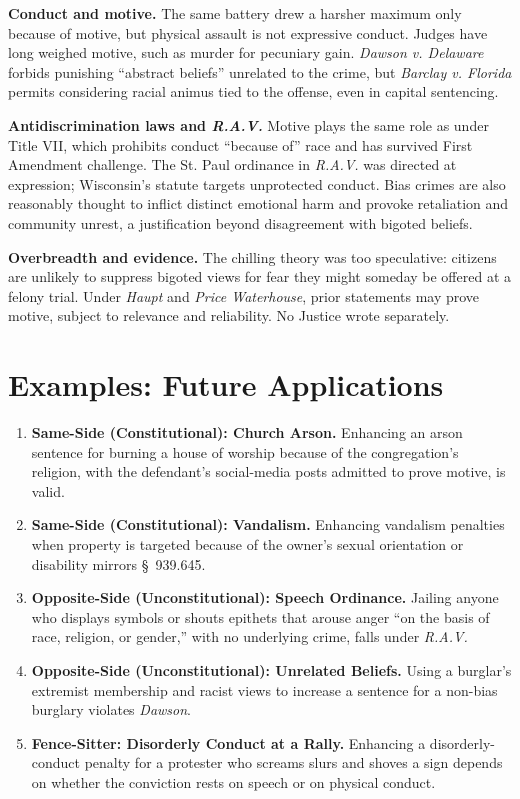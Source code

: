 \documentclass[12pt]{article}
\begin{document}
\textbf{Conduct and motive.} The same battery drew a harsher maximum only because of motive, but physical assault is not expressive conduct. Judges have long weighed motive, such as murder for pecuniary gain. \textit{Dawson v. Delaware} forbids punishing ``abstract beliefs'' unrelated to the crime, but \textit{Barclay v. Florida} permits considering racial animus tied to the offense, even in capital sentencing.

\textbf{Antidiscrimination laws and \textit{R.A.V.}} Motive plays the same role as under Title VII, which prohibits conduct ``because of'' race and has survived First Amendment challenge. The St. Paul ordinance in \textit{R.A.V.} was directed at expression; Wisconsin's statute targets unprotected conduct. Bias crimes are also reasonably thought to inflict distinct emotional harm and provoke retaliation and community unrest, a justification beyond disagreement with bigoted beliefs.

\textbf{Overbreadth and evidence.} The chilling theory was too speculative: citizens are unlikely to suppress bigoted views for fear they might someday be offered at a felony trial. Under \textit{Haupt} and \textit{Price Waterhouse}, prior statements may prove motive, subject to relevance and reliability. No Justice wrote separately.

\section{Examples: Future Applications}

\begin{enumerate}
\item \textbf{Same-Side (Constitutional): Church Arson.} Enhancing an arson sentence for burning a house of worship because of the congregation's religion, with the defendant's social-media posts admitted to prove motive, is valid.
\item \textbf{Same-Side (Constitutional): Vandalism.} Enhancing vandalism penalties when property is targeted because of the owner's sexual orientation or disability mirrors \S~939.645.
\item \textbf{Opposite-Side (Unconstitutional): Speech Ordinance.} Jailing anyone who displays symbols or shouts epithets that arouse anger ``on the basis of race, religion, or gender,'' with no underlying crime, falls under \textit{R.A.V.}
\item \textbf{Opposite-Side (Unconstitutional): Unrelated Beliefs.} Using a burglar's extremist membership and racist views to increase a sentence for a non-bias burglary violates \textit{Dawson}.
\item \textbf{Fence-Sitter: Disorderly Conduct at a Rally.} Enhancing a disorderly-conduct penalty for a protester who screams slurs and shoves a sign depends on whether the conviction rests on speech or on physical conduct.
\end{enumerate}
\end{document}
